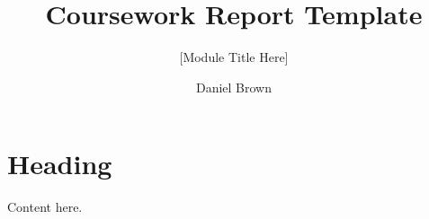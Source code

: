 \documentclass[paper=a4,fontsize=12pt]{scrartcl}
\author{Daniel Brown}
\title{Coursework Report Template}
\subtitle{[Module Title Here]}
\begin{document}
\maketitle

\clearpage
\section{Heading}
Content here.

\printbibliography
\end{document}
